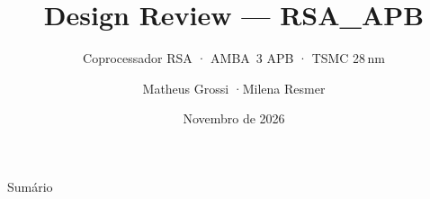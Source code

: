 \documentclass[aspectratio=169,10pt,t]{beamer}
\title[Design Review · RSA\_APB]{Design Review — RSA\_APB}
\subtitle{Coprocessador RSA · AMBA~3 APB · TSMC 28\,nm}
\author[Matheus Grossi · Milena Resmer]{Matheus Grossi \quad·\quad Milena Resmer}
\institute{TchêMOS — Semiconductor Design House}
\date{Novembro de 2026}
\begin{document}
\begin{frame}
  \titlepage
\end{frame}

\begin{frame}{Sumário}
  \vspace*{-0.1cm}
  \centering
  \begin{minipage}{0.78\textwidth}
    \small
    \tableofcontents
  \end{minipage}
\end{frame}

\end{document}
